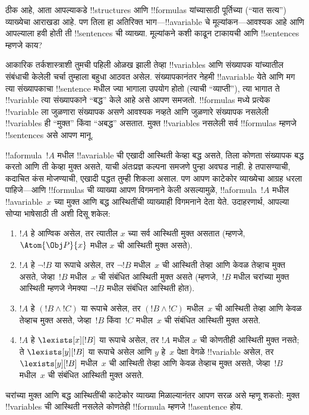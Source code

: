 \documentclass[../../../include/open-logic-section]{subfiles}
\begin{document}


ठीक आहे, आता आपल्याकडे !!{structure}s आणि !!{formula}s यांच्यासाठी
पूर्तिच्या (``यात सत्य'') व्याख्येचा आराखडा आहे. पण तिला हा अतिरिक्त
भाग---!!a{variable} चे मूल्यांकन---आवश्यक आहे आणि आपल्याला हवी होती ती
!!{sentence}s ची व्याख्या. मूल्यांकने कशी काढून टाकायची आणि
!!{sentence}s म्हणजे काय?

आकारिक तर्कशास्त्राशी तुमची पहिली ओळख झाली तेव्हा !!{variable}s आणि
संख्यापक यांच्यातील संबंधाची केलेली चर्चा तुम्हाला बहुधा आठवत असेल.
संख्यापकानंतर नेहमी !!a{variable} येते आणि मग त्या संख्यापकाचा
!!{sentence} मधील ज्या भागाला उपयोग होतो (त्याची ``व्याप्ती''), त्या
भागात ते !!{variable} त्या संख्यापकाने ``बद्ध'' केले आहे असे आपण
समजतो. !!{formula}s मध्ये प्रत्येक !!{variable} ला जुळणारा संख्यापक
असणे आवश्यक नव्हते आणि जुळणारे संख्यापक नसलेली !!{variable}s ही
``मुक्त'' किंवा ``अबद्ध'' असतात. मुक्त !!{variable}s नसलेली सर्व
!!{formula}s म्हणजे !!{sentence}s असे आपण मानू.

!!a{formula}~$!A$ मधील !!a{variable} ची एखादी आस्थिती केव्हा बद्ध असते,
तिला कोणता संख्यापक बद्ध करतो आणि ती केव्हा मुक्त असते, याची अंतःप्रज्ञ
कल्पना समजणे पुन्हा अवघड नाही. हे तपासण्याची, कदाचित कंस मोजण्याची,
एखादी पद्धत तुम्ही शिकला असाल. पण आपण काटेकोर व्याख्येचा आग्रह धरला
पाहिजे---आणि !!{formula}s ची व्याख्या आपण विगमनाने केली असल्यामुळे,
!!a{formula}~$!A$ मधील !!a{variable}~$x$ च्या मुक्त आणि बद्ध आस्थितींची
व्याख्याही विगमनाने देता येते. उदाहरणार्थ, आपल्या सोप्या भाषेसाठी ती
अशी दिसू शकेल:
\begin{enumerate}
  \item $!A$ हे आण्विक असेल, तर त्यातील $x$ च्या सर्व आस्थिती मुक्त
  असतात (म्हणजे, $\Atom{\Obj P}{x}$ मधील $x$ ची आस्थिती मुक्त असते).
  \item $!A$ हे $\lnot !B$ या रूपाचे असेल, तर $\lnot !B$ मधील~$x$ ची
  आस्थिती तेव्हा आणि केवळ तेव्हाच मुक्त असते, जेव्हा~$!B$ मधील~$x$ ची
  संबंधित आस्थिती मुक्त असते (म्हणजे,~$!B$ मधील चरांच्या मुक्त
  आस्थिती म्हणजे नेमक्या $\lnot !B$ मधील संबंधित आस्थिती होत).
  \item $!A$ हे $(!B \land !C)$ या रूपाचे असेल, तर $(!B \land !C)$
  मधील~$x$ ची आस्थिती तेव्हा आणि केवळ तेव्हाच मुक्त असते, जेव्हा~$!B$
  किंवा~$!C$ मधील~$x$ ची संबंधित आस्थिती मुक्त असते.
  \item $!A$ हे $\lexists[x][!B]$ या रूपाचे असेल, तर $!A$ मधील $x$ ची
  कोणतीही आस्थिती मुक्त नसते; ते $\lexists[y][!B]$ या रूपाचे असेल आणि
  $y$ हे~$x$ पेक्षा वेगळे !!{variable} असेल, तर
  $\lexists[y][!B]$ मधील~$x$ ची आस्थिती तेव्हा आणि केवळ तेव्हाच मुक्त
  असते, जेव्हा~$!B$ मधील~$x$ ची संबंधित आस्थिती मुक्त असते.
\end{enumerate}

चरांच्या मुक्त आणि बद्ध आस्थितींची काटेकोर व्याख्या मिळाल्यानंतर आपण
सरळ असे म्हणू शकतो: मुक्त !!{variable}s ची आस्थिती नसलेले कोणतेही
!!{formula} म्हणजे !!a{sentence} होय.
\end{document}
